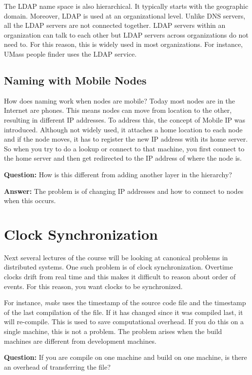 \documentclass[twoside]{article}
\begin{document}
The LDAP name space is also hierarchical. It typically starts with the geographic domain. Moreover, LDAP is used at an organizational level. Unlike DNS servers, all the LDAP servers are not connected together. LDAP servers within an organization can talk to each other but LDAP servers across organizations do not need to. For this reason, this is widely used in most organizations. For instance, UMass people finder uses the LDAP service.

\subsection{Naming with Mobile Nodes}
How does naming work when nodes are mobile? Today most nodes are in the Internet are phones. This means nodes can move from location to the other, resulting in different IP addresses. To address this, the concept of Mobile IP was introduced. Although not widely used, it attaches a home location to each node and if the node moves, it has to register the new IP address with its home server. So when you try to do a lookup or connect to that machine, you first connect to the home server and then get redirected to the IP address of where the node is. 

\textbf{Question: } How is this different from adding another layer in the hierarchy?

\textbf{Answer: } The problem is of changing IP addresses and how to connect to nodes when this occurs.

\section{Clock Synchronization}
Next several lectures of the course will be looking at canonical problems in distributed systems. One such problem is of clock synchronization. Overtime clocks drift from real time and this makes it difficult to reason about order of events. For this reason, you want clocks to be synchronized.

For instance, \textit{make} uses the timestamp of the source code file and the timestamp of the last compilation of the file. If it has changed since it was compiled last, it will re-compile. This is used to save computational overhead. If you do this on a single machine, this is not a problem. The problem arises when the build machines are different from development machines.

\textbf{Question: } If you are compile on one machine and build on one machine, is there an overhead of transferring the file?
\end{document}
